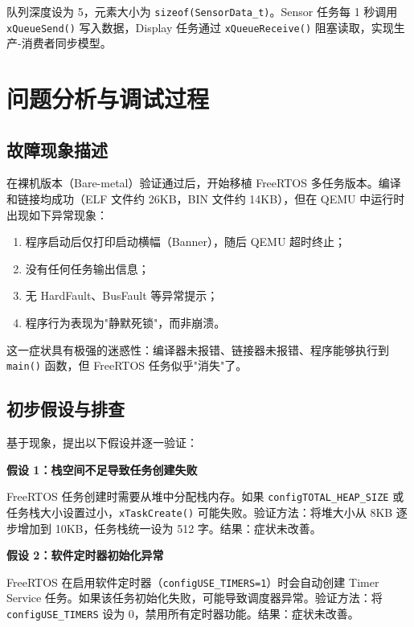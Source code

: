 \documentclass[12pt,a4paper]{ctexart}
\begin{document}
队列深度设为 5，元素大小为 \texttt{sizeof(SensorData\_t)}。Sensor 任务每 1 秒调用 \texttt{xQueueSend()} 写入数据，Display 任务通过 \texttt{xQueueReceive()} 阻塞读取，实现生产-消费者同步模型。



\section{问题分析与调试过程}\label{sec:debug}

\subsection{故障现象描述}

在裸机版本（Bare-metal）验证通过后，开始移植 FreeRTOS 多任务版本。编译和链接均成功（ELF 文件约 26KB，BIN 文件约 14KB），但在 QEMU 中运行时出现如下异常现象：

\begin{enumerate}[leftmargin=2em]
    \item 程序启动后仅打印启动横幅（Banner），随后 QEMU 超时终止；
    \item 没有任何任务输出信息；
    \item 无 HardFault、BusFault 等异常提示；
    \item 程序行为表现为"静默死锁"，而非崩溃。
\end{enumerate}

这一症状具有极强的迷惑性：编译器未报错、链接器未报错、程序能够执行到 \texttt{main()} 函数，但 FreeRTOS 任务似乎"消失"了。

\subsection{初步假设与排查}

基于现象，提出以下假设并逐一验证：

\textbf{假设 1：栈空间不足导致任务创建失败}

FreeRTOS 任务创建时需要从堆中分配栈内存。如果 \texttt{configTOTAL\_HEAP\_SIZE} 或任务栈大小设置过小，\texttt{xTaskCreate()} 可能失败。验证方法：将堆大小从 8KB 逐步增加到 10KB，任务栈统一设为 512 字。结果：症状未改善。

\textbf{假设 2：软件定时器初始化异常}

FreeRTOS 在启用软件定时器（\texttt{configUSE\_TIMERS=1}）时会自动创建 Timer Service 任务。如果该任务初始化失败，可能导致调度器异常。验证方法：将 \texttt{configUSE\_TIMERS} 设为 0，禁用所有定时器功能。结果：症状未改善。
\end{document}
